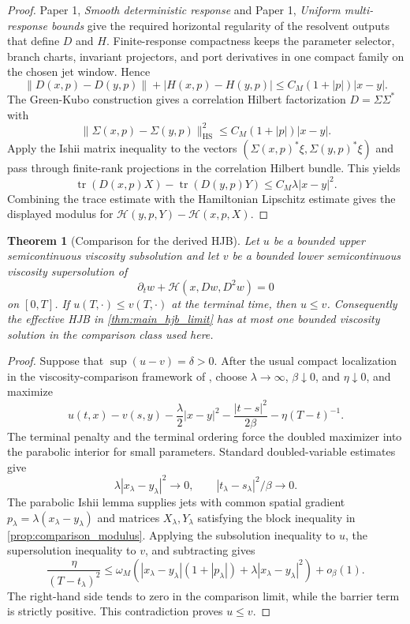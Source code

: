 \documentclass[11pt]{amsart}
\newtheorem{theorem}{Theorem}[section]
\theoremstyle{definition}
\theoremstyle{remark}
\newcommand{\Hcal}{\mathcal H}
\newcommand{\PaperOne}[2]{Paper 1, \emph{#1}}
\begin{document}
\begin{proof}
\PaperOne{Smooth deterministic response}{thm:smooth_deterministic_response}
and \PaperOne{Uniform multi-response bounds}{prop:uniform_multiresponse_bounds}
give the required horizontal regularity of the resolvent outputs that define
$D$ and $H$.  Finite-response compactness keeps the parameter selector, branch
charts, invariant projectors, and port derivatives in one compact family on the
chosen jet window.  Hence
\[
  \|D(x,p)-D(y,p)\|+|H(x,p)-H(y,p)|
  \le C_M(1+|p|)|x-y|.
\]
The Green-Kubo construction gives a correlation Hilbert factorization
$D=\Sigma\Sigma^*$ with
\[
  \|\Sigma(x,p)-\Sigma(y,p)\|_{\operatorname{HS}}^2
  \le C_M(1+|p|)|x-y|.
\]
Apply the Ishii matrix inequality to the vectors
$(\Sigma(x,p)^*\xi,\Sigma(y,p)^*\xi)$ and pass through finite-rank projections
in the correlation Hilbert bundle.  This yields
\[
  \operatorname{tr}(D(x,p)X)-\operatorname{tr}(D(y,p)Y)
  \le C_M\lambda |x-y|^2 .
\]
Combining the trace estimate with the Hamiltonian Lipschitz estimate gives the
displayed modulus for $\Hcal(y,p,Y)-\Hcal(x,p,X)$.
\end{proof}

\begin{theorem}[Comparison for the derived HJB]
\label{thm:comparison_derived_hjb}
Let $u$ be a bounded upper semicontinuous viscosity subsolution and let $v$ be a
bounded lower semicontinuous viscosity supersolution of
\begin{equation}
  \partial_t w+\Hcal(x,Dw,D^2w)=0
\end{equation}
on $[0,T]$.  If $u(T,\cdot)\le v(T,\cdot)$ at the terminal time, then $u\le v$.
Consequently the effective HJB in \cref{thm:main_hjb_limit} has at most one
bounded viscosity solution in the comparison class used here.
\end{theorem}

\begin{proof}
Suppose that $\sup(u-v)=\delta>0$.  After the usual compact localization in the
viscosity-comparison framework of
\cite{CrandallIshiiLions1992,FlemingSoner2006},
choose $\lambda\to\infty$, $\beta\downarrow0$, and $\eta\downarrow0$, and
maximize
\[
  u(t,x)-v(s,y)-\frac{\lambda}{2}|x-y|^2
  -\frac{|t-s|^2}{2\beta}-\eta(T-t)^{-1}.
\]
The terminal penalty and the terminal ordering force the doubled maximizer into
the parabolic interior for small parameters.  Standard doubled-variable
estimates give
\[
  \lambda |x_\lambda-y_\lambda|^2\to0,\qquad
  |t_\lambda-s_\lambda|^2/\beta\to0 .
\]
The parabolic Ishii lemma supplies jets with common spatial gradient
$p_\lambda=\lambda(x_\lambda-y_\lambda)$ and matrices $X_\lambda,Y_\lambda$
satisfying the block inequality in \cref{prop:comparison_modulus}.  Applying
the subsolution inequality to $u$, the supersolution inequality to $v$, and
subtracting gives
\[
  \frac{\eta}{(T-t_\lambda)^2}
  \le
  \omega_M\!\left(|x_\lambda-y_\lambda|(1+|p_\lambda|)
  +\lambda |x_\lambda-y_\lambda|^2\right)+o_\beta(1).
\]
The right-hand side tends to zero in the comparison limit, while the barrier
term is strictly positive.  This contradiction proves $u\le v$.
\end{proof}
\end{document}
